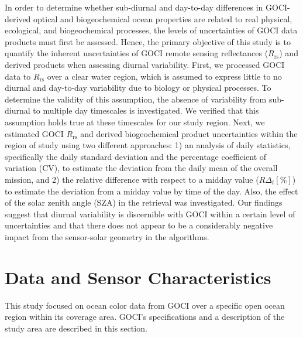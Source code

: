 \documentclass[remotesensing,article,submit,moreauthors,pdftex,10pt,a4paper]{Definitions/mdpi}
\begin{document}
In order to determine whether sub-diurnal and day-to-day differences in GOCI-derived optical and biogeochemical ocean properties are related to real physical, ecological, and biogeochemical processes, the levels of uncertainties of GOCI data products must first be assessed. Hence, the primary objective of this study is to quantify the inherent uncertainties of GOCI remote sensing reflectances ($R_\text{rs}$) and derived products when assessing diurnal variability. First, we processed GOCI data to $R_\text{rs}$ over a clear water region, which is assumed to express little to no diurnal and day-to-day variability due to biology or physical processes. To determine the validity of this assumption, the absence of variability from sub-diurnal to multiple day timescales is investigated. We verified that this assumption holds true at these timescales for our study region. Next, we estimated GOCI $R_\text{rs}$ and derived biogeochemical product uncertainties within the region of study using two different approaches: 1) an analysis of daily statistics, specifically the daily standard deviation and the percentage coefficient of variation (CV), to estimate the deviation from the daily mean of the overall mission, and 2) the relative difference with respect to a midday value ($R\Delta_t[\%]$) to estimate the deviation from a midday value by time of the day. Also, the effect of the solar zenith angle (SZA) in the retrieval was investigated. Our findings suggest that diurnal variability is discernible with GOCI within a certain level of uncertainties and that there does not appear to be a considerably negative impact from the sensor-solar geometry in the algorithms. 



\section{Data and Sensor Characteristics}
This study focused on ocean color data from GOCI over a specific open ocean region within its coverage area. GOCI’s specifications and a description of the study area are described in this section.
\end{document}
